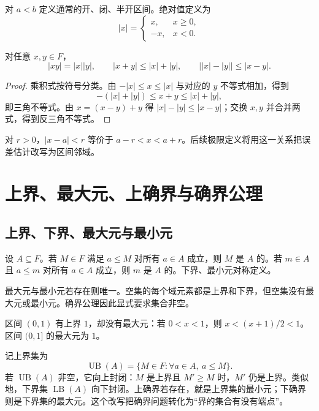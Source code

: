 对 \(a<b\) 定义通常的开、闭、半开区间。绝对值定义为
\[
 |x|=\begin{cases}x,&x\ge0,\\-x,&x<0.\end{cases}
\]

\begin{theorem}[绝对值不等式]
对任意 \(x,y\in F\)，
\[
 |xy|=|x||y|,\qquad |x+y|\le|x|+|y|,\qquad
 \bigl||x|-|y|\bigr|\le|x-y|.
\]
\end{theorem}

\begin{proof}
乘积式按符号分类。由 \(-|x|\le x\le|x|\) 与对应的 \(y\) 不等式相加，得到
\[
 -(|x|+|y|)\le x+y\le|x|+|y|,
\]
即三角不等式。由 \(x=(x-y)+y\) 得 \(|x|-|y|\le|x-y|\)；交换 \(x,y\) 并合并两式，得到反三角不等式。
\end{proof}

对 \(r>0\)，\(|x-a|<r\) 等价于 \(a-r<x<a+r\)。后续极限定义将用这一关系把误差估计改写为区间邻域。

\section{上界、最大元、上确界与确界公理}

\subsection{上界、下界、最大元与最小元}


\begin{definition}
设 \(A\subseteq F\)。若 \(M\in F\) 满足 \(a\le M\) 对所有 \(a\in A\) 成立，则 \(M\) 是 \(A\) 的。若 \(m\in A\) 且 \(a\le m\) 对所有 \(a\in A\) 成立，则 \(m\) 是 \(A\) 的。下界、最小元对称定义。
\end{definition}

最大元与最小元若存在则唯一。空集的每个域元素都是上界和下界，但空集没有最大元或最小元。确界公理因此显式要求集合非空。

\begin{example}
区间 \((0,1)\) 有上界 \(1\)，却没有最大元：若 \(0<x<1\)，则 \(x<(x+1)/2<1\)。区间 \((0,1]\) 的最大元为 \(1\)。
\end{example}

记上界集为
\[
 \operatorname{UB}(A)=\{M\in F:\forall a\in A,\ a\le M\}.
\]
若 \(\operatorname{UB}(A)\) 非空，它向上封闭：\(M\) 是上界且 \(M'\ge M\) 时，\(M'\) 仍是上界。类似地，下界集 \(\operatorname{LB}(A)\) 向下封闭。上确界若存在，就是上界集的最小元；下确界则是下界集的最大元。这个改写把确界问题转化为“界的集合有没有端点”。

